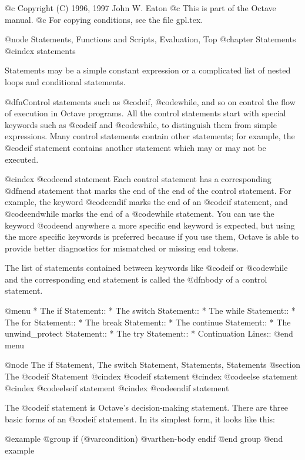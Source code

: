 @c Copyright (C) 1996, 1997 John W. Eaton
@c This is part of the Octave manual.
@c For copying conditions, see the file gpl.tex.

@node Statements, Functions and Scripts, Evaluation, Top
@chapter Statements
@cindex statements

Statements may be a simple constant expression or a complicated list of
nested loops and conditional statements.

@dfn{Control statements} such as @code{if}, @code{while}, and so on
control the flow of execution in Octave programs.  All the control
statements start with special keywords such as @code{if} and
@code{while}, to distinguish them from simple expressions.
Many control statements contain other statements; for example, the
@code{if} statement contains another statement which may or may not be
executed.

@cindex @code{end} statement
Each control statement has a corresponding @dfn{end} statement that
marks the end of the end of the control statement.  For example, the
keyword @code{endif} marks the end of an @code{if} statement, and
@code{endwhile} marks the end of a @code{while} statement.  You can use
the keyword @code{end} anywhere a more specific end keyword is expected,
but using the more specific keywords is preferred because if you use
them, Octave is able to provide better diagnostics for mismatched or
missing end tokens.

The list of statements contained between keywords like @code{if} or
@code{while} and the corresponding end statement is called the
@dfn{body} of a control statement.

@menu
* The if Statement::            
* The switch Statement::        
* The while Statement::         
* The for Statement::           
* The break Statement::         
* The continue Statement::      
* The unwind_protect Statement::  
* The try Statement::           
* Continuation Lines::          
@end menu

@node The if Statement, The switch Statement, Statements, Statements
@section The @code{if} Statement
@cindex @code{if} statement
@cindex @code{else} statement
@cindex @code{elseif} statement
@cindex @code{endif} statement

The @code{if} statement is Octave's decision-making statement.  There
are three basic forms of an @code{if} statement.  In its simplest form,
it looks like this:

@example
@group
if (@var{condition})
  @var{then-body}
endif
@end group
@end example

